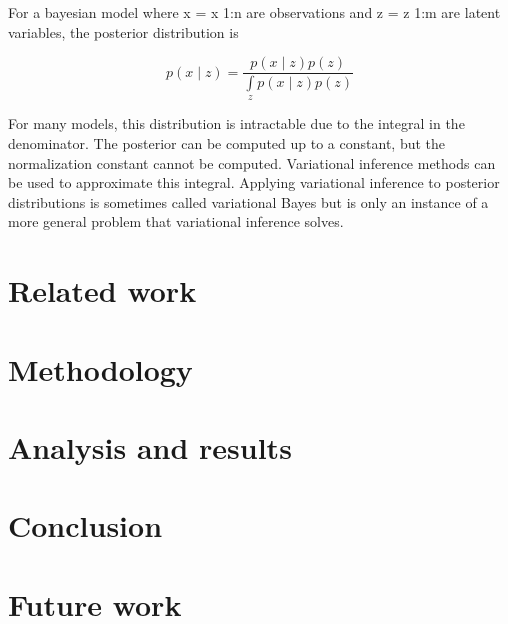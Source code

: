 \documentclass[12pt]{report}
\begin{document}
For a bayesian model where x = x 1:n are observations and z = z 1:m are 
latent variables, the posterior distribution is

\begin{equation}
p(x \mid z) = \frac{p(x \mid z) p(z)}{\int\limits_{z} p(x \mid z)p(z)}
\end{equation}

For many models, this distribution is intractable due to the integral in the 
denominator. The posterior can be computed up to a constant, but the normalization 
constant cannot be computed. Variational inference methods can be used to approximate 
this integral. Applying variational inference to posterior distributions is sometimes 
called variational Bayes but is only an instance of a more general problem that 
variational inference solves.


\section{Related work}

\section{Methodology}

\section{Analysis and results}

\section{Conclusion}

\section{Future work}
\end{document}

